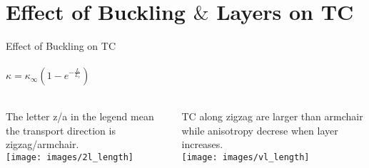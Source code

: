 \documentclass{beamer}
\begin{document}
\section{Effect of Buckling $\&$ Layers on TC}
\begin{frame}{Effect of Buckling on TC}
  \framesubtitle{$\kappa = \kappa_\infty (1-e^{-\frac{L}{L_c}})$}%

  \begin{columns}[onlytextwidth]
    \tiny
    The letter z/a in the legend mean the transport direction is zigzag/armchair.\\
    \texttt{[image: images/2l\_length]}

    TC along zigzag are larger than armchair while anisotropy decrese when layer increases.\\
    \texttt{[image: images/vl\_length]}

  \end{columns}

\end{frame}
\end{document}
